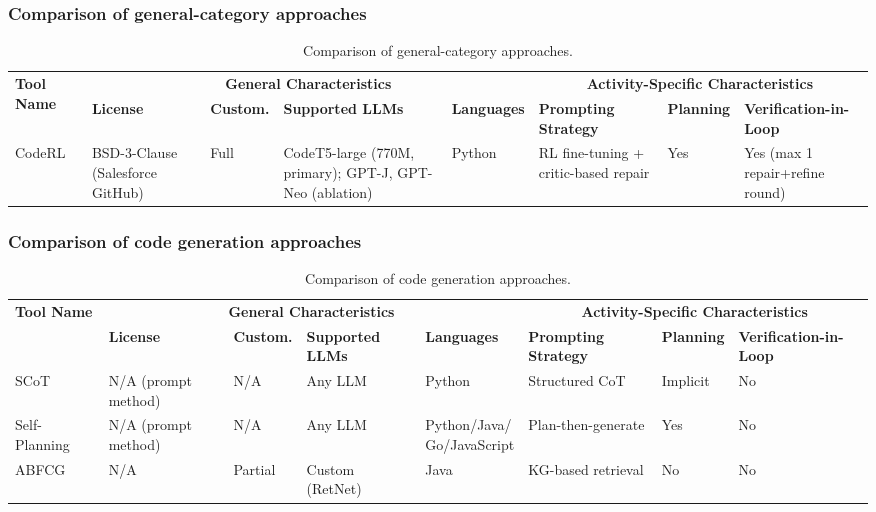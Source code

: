 \documentclass[10pt,a4paper]{article}
\begin{document}
\subsubsection{Comparison of general-category approaches}
\begin{table}[!t]
\centering
\caption{Comparison of general-category approaches.}
\label{tab:cmp_general}
\footnotesize
\setlength{\tabcolsep}{2.8pt}
\renewcommand{\arraystretch}{1.1}
\begin{tabularx}{\textwidth}{@{}p{58pt}p{58pt}p{38pt}p{72pt}p{58pt}p{75pt}p{42pt}X@{}}
\toprule
\multirow{2}{*}{\textbf{Tool Name}} & \multicolumn{4}{c}{\textbf{General Characteristics}} & \multicolumn{3}{c}{\textbf{Activity-Specific Characteristics}} \\
\cmidrule(lr){2-5} \cmidrule(lr){6-8}
 & \textbf{License} & \textbf{Custom.} & \textbf{Supported LLMs} & \textbf{Languages} & \textbf{Prompting Strategy} & \textbf{Planning} & \textbf{Verification-in-Loop} \\
\midrule
CodeRL~\cite{le2022coderl} & BSD-3-Clause (Salesforce GitHub) & Full & CodeT5-large (770M, primary); GPT-J, GPT-Neo (ablation) & Python & RL fine-tuning + critic-based repair & Yes & Yes (max 1 repair+refine round) \\
\bottomrule
\end{tabularx}
\end{table}

\subsubsection{Comparison of code generation approaches}
\begin{table}[!t]
\centering
\caption{Comparison of code generation approaches.}
\label{tab:cmp_generation}
\footnotesize
\setlength{\tabcolsep}{2.8pt}
\renewcommand{\arraystretch}{1.1}
\begin{tabularx}{\textwidth}{@{}p{58pt}p{58pt}p{38pt}p{72pt}p{58pt}p{75pt}p{42pt}X@{}}
\toprule
\multirow{2}{*}{\textbf{Tool Name}} & \multicolumn{4}{c}{\textbf{General Characteristics}} & \multicolumn{3}{c}{\textbf{Activity-Specific Characteristics}} \\
\cmidrule(lr){2-5} \cmidrule(lr){6-8}
 & \textbf{License} & \textbf{Custom.} & \textbf{Supported LLMs} & \textbf{Languages} & \textbf{Prompting Strategy} & \textbf{Planning} & \textbf{Verification-in-Loop} \\
\midrule
SCoT~\cite{li2025scot} & N/A (prompt method) & N/A & Any LLM & Python & Structured CoT & Implicit & No \\
Self-Planning~\cite{jiang2024selfplan} & N/A (prompt method) & N/A & Any LLM & \makecell{Python/Java/\\Go/JavaScript} & Plan-then-generate & Yes & No \\
ABFCG~\cite{zhang2025abfcg} & N/A & Partial & Custom (RetNet) & Java & KG-based retrieval & No & No \\
\bottomrule
\end{tabularx}
\end{table}
\end{document}
